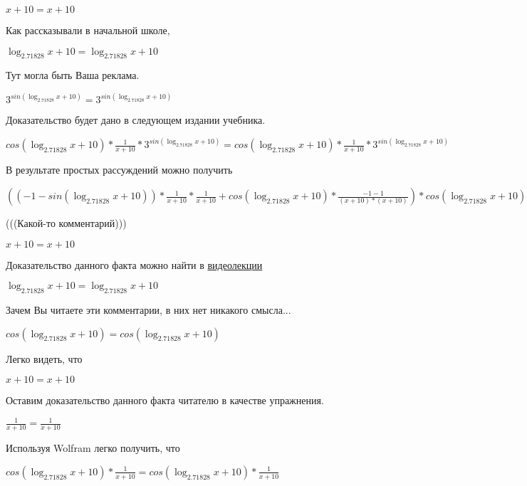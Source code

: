 \documentclass[12pt,a4paper,fleqn]{article}
\theoremstyle{definition}
\begin{document}
$ x  +  10  =  x  +  10 $

Как рассказывали в начальной школе,

$\log_{ 2.71828 }{ x  +  10 } = \log_{ 2.71828 }{ x  +  10 }$

Тут могла быть Ваша реклама.

${ 3 }^{sin(\log_{ 2.71828 }{ x  +  10 })} = { 3 }^{sin(\log_{ 2.71828 }{ x  +  10 })}$

Доказательство будет дано в следующем издании учебника.

$cos(\log_{ 2.71828 }{ x  +  10 }) * \frac{ 1 }{ x  +  10 }
 * { 3 }^{sin(\log_{ 2.71828 }{ x  +  10 })} = cos(\log_{ 2.71828 }{ x  +  10 }) * \frac{ 1 }{ x  +  10 }
 * { 3 }^{sin(\log_{ 2.71828 }{ x  +  10 })}$

В результате простых рассуждений можно получить

$(( -1  - sin(\log_{ 2.71828 }{ x  +  10 })) * \frac{ 1 }{ x  +  10 }
 * \frac{ 1 }{ x  +  10 }
 + cos(\log_{ 2.71828 }{ x  +  10 }) * \frac{ -1  -  1 }{( x  +  10 ) * ( x  +  10 )}
) * cos(\log_{ 2.71828 }{ x  +  10 }) * \frac{ 1 }{ x  +  10 }
 * { 3 }^{sin(\log_{ 2.71828 }{ x  +  10 })} = (( -1  - sin(\log_{ 2.71828 }{ x  +  10 })) * \frac{ 1 }{ x  +  10 }
 * \frac{ 1 }{ x  +  10 }
 + cos(\log_{ 2.71828 }{ x  +  10 }) * \frac{ -1  -  1 }{( x  +  10 ) * ( x  +  10 )}
) * cos(\log_{ 2.71828 }{ x  +  10 }) * \frac{ 1 }{ x  +  10 }
 * { 3 }^{sin(\log_{ 2.71828 }{ x  +  10 })}$

(((Какой-то комментарий)))

$ x  +  10  =  x  +  10 $

Доказательство данного факта можно найти в \href{https://www.youtube.com/watch?v=dQw4w9WgXcQ}{видеолекции}

$\log_{ 2.71828 }{ x  +  10 } = \log_{ 2.71828 }{ x  +  10 }$

Зачем Вы читаете эти комментарии, в них нет никакого смысла...

$cos(\log_{ 2.71828 }{ x  +  10 }) = cos(\log_{ 2.71828 }{ x  +  10 })$

Легко видеть, что

$ x  +  10  =  x  +  10 $

Оставим доказательство данного факта читателю в качестве упражнения.

$\frac{ 1 }{ x  +  10 }
 = \frac{ 1 }{ x  +  10 }
$

Используя Wolfram легко получить, что

$cos(\log_{ 2.71828 }{ x  +  10 }) * \frac{ 1 }{ x  +  10 }
 = cos(\log_{ 2.71828 }{ x  +  10 }) * \frac{ 1 }{ x  +  10 }
$
\end{document}
